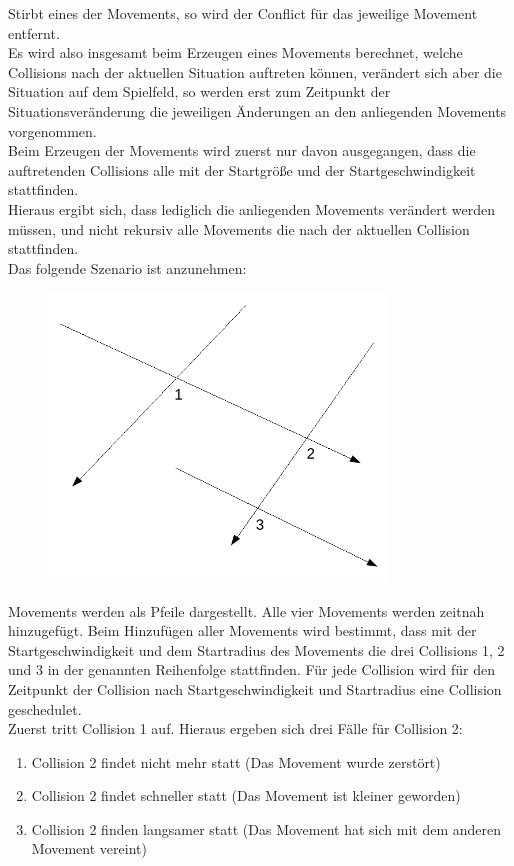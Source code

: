 Stirbt eines der Movements, so wird der Conflict für das jeweilige Movement entfernt. \\
Es wird also insgesamt beim Erzeugen eines Movements berechnet, welche Collisions nach der aktuellen Situation auftreten können, 
verändert sich aber die Situation auf dem Spielfeld, so werden erst zum Zeitpunkt der Situationsveränderung die jeweiligen Änderungen 
an den anliegenden Movements vorgenommen. \\
Beim Erzeugen der Movements wird zuerst nur davon ausgegangen, dass die auftretenden Collisions alle mit der Startgröße und der Startgeschwindigkeit stattfinden. \\
Hieraus ergibt sich, dass lediglich die anliegenden Movements verändert werden müssen, und nicht rekursiv alle Movements die nach der aktuellen Collision stattfinden. \\
Das folgende Szenario ist anzunehmen:
\begin{figure}[H]
	\centering
	\includegraphics[width=0.8\textwidth]{Collision.png}
\end{figure}
Movements werden als Pfeile dargestellt. Alle vier Movements werden zeitnah hinzugefügt. Beim Hinzufügen aller Movements wird bestimmt, dass mit der Startgeschwindigkeit und dem Startradius des Movements die drei Collisions 1, 2 und 3 in der genannten Reihenfolge stattfinden. Für jede Collision wird für den Zeitpunkt der Collision nach Startgeschwindigkeit und Startradius eine Collision geschedulet. \\
Zuerst tritt Collision 1 auf. Hieraus ergeben sich drei Fälle für Collision 2:
\begin{enumerate}
	\item Collision 2 findet nicht mehr statt (Das Movement wurde zerstört)
	\item Collision 2 findet schneller statt (Das Movement ist kleiner geworden)
	\item Collision 2 finden langsamer statt (Das Movement hat sich mit dem anderen Movement vereint)
\end{enumerate}
